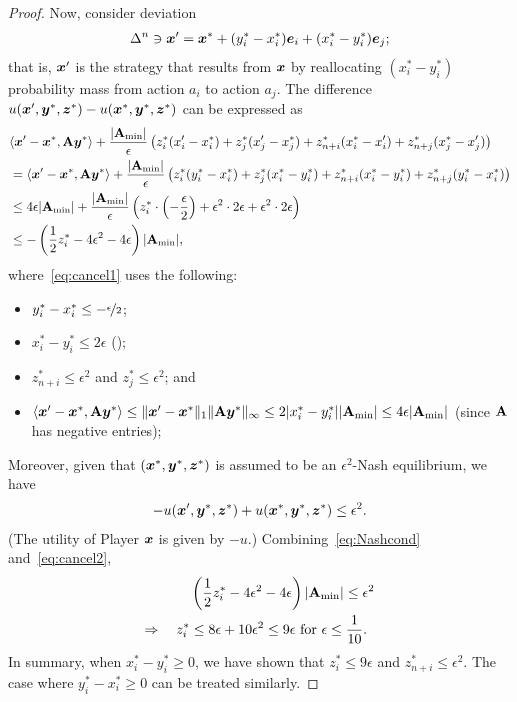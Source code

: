 \begin{proof}
    Now, consider deviation
    \begin{align*}
        \Delta^n \ni {\bm{x}}' = {\bm{x}}^* + (y^*_i - x^*_i) {\bm{e}}_i + (x^*_i - y^*_i) {\bm{e}}_j;
    \end{align*}
    that is, ${\bm{x}}'$ is the strategy that results from ${\bm{x}}$ by reallocating $(x^*_i - y^*_i)$ probability mass from action $a_i$ to action $a_j$. The difference $u({\bm{x}}', {\bm{y}}^*, {\bm{z}}^*) - u({\bm{x}}^*, {\bm{y}}^*, {\bm{z}}^*)$ can be expressed as
    \begin{align}
        &\langle {\bm{x}}' - {\bm{x}}^*, \mathbf{A} {\bm{y}}^* \rangle + \frac{|\mathbf{A}_{\min}|}{\epsilon} \left(z^*_i (x_i' - x_i^*) + z^*_j (x'_j - x^*_j) + z^*_{n + i}(x^*_i - x_i') + z^*_{n + j}(x^*_j - x'_j)\right) \notag \\
        &= \langle {\bm{x}}' - {\bm{x}}^*, \mathbf{A} {\bm{y}}^* \rangle + \frac{|\mathbf{A}_{\min}|}{\epsilon} \left(z^*_i (y_i^* - x_i^*) + z^*_j (x_i^* - y_i^*) + z^*_{n + i}(x^*_i - y_i^*) + z^*_{n + j}(y_i^* - x_i^* )\right) \notag \\
        &\leq 4 \epsilon |\mathbf{A}_{\min}| + \frac{|\mathbf{A}_{\min}|}{\epsilon} \left(z^*_i \cdot \left( - \frac{\epsilon}{2} \right) + \epsilon^2 \cdot 2 \epsilon + \epsilon^2 \cdot 2 \epsilon\right) \label{eq:cancel1}\\
        &\leq - \left( \frac{1}{2}z^*_i - 4 \epsilon^2-4 \epsilon \right) |\mathbf{A}_{\min}|, \label{eq:cancel2}
    \end{align}
    where~\eqref{eq:cancel1} uses the following:
    \begin{itemize}
        \item $ y_i^* - x_i^* \leq - \nicefrac{\epsilon}{2}$; 
        \item $x_i^* - y_i^* \leq 2 \epsilon$ ();
        \item $z^*_{n + i} \leq \epsilon^2$ and $z_j^* \leq \epsilon^2$; and 
        \item $\langle {\bm{x}}' - {\bm{x}}^*, \mathbf{A} {\bm{y}}^* \rangle \leq \| {\bm{x}}' - {\bm{x}}^* \|_1 \|\mathbf{A} {\bm{y}}^* \|_\infty \leq 2 | x_i^* - y_i^* | |\mathbf{A}_{\min}| \leq 4 \epsilon |\mathbf{A}_{\min}| $ (since $\mathbf{A}$ has negative entries); 
    \end{itemize}
    Moreover, given that $({\bm{x}}^*, {\bm{y}}^*, {\bm{z}}^*)$ is assumed to be an $\epsilon^2$-Nash equilibrium, we have 
    \begin{align}
        \label{eq:Nashcond}
        - u({\bm{x}}', {\bm{y}}^*, {\bm{z}}^*) + u({\bm{x}}^*, {\bm{y}}^*, {\bm{z}}^*) \leq \epsilon^2.
    \end{align}
    (The utility of Player ${\bm{x}}$ is given by $-u$.) Combining~\eqref{eq:Nashcond} and~\eqref{eq:cancel2},
    \begin{align}
         &\left(\frac{1}{2} z^*_i - 4 \epsilon^2-4 \epsilon\right) |\mathbf{A}_{\min}| \leq  \epsilon^2 \\
        \Rightarrow \quad  z^*_i & \leq 8 \epsilon + 10\epsilon^2 \leq  9 \epsilon \textrm{ for }\epsilon \leq \frac{1}{10}.
    \end{align}
    In summary, when $x_i^* - y_i^* \geq 0$, we have shown that $z_i^* \leq 9 \epsilon$ and $z_{n+i}^* \leq \epsilon^2$. The case where $y_i^* - x_i^* \geq 0$ can be treated similarly.
\end{proof}

